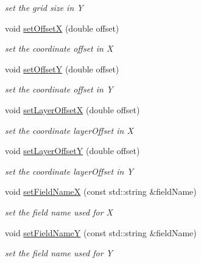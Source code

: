 \begin{DoxyCompactItemize}
\begin{DoxyCompactList}\small\item\em set the grid size in Y \end{DoxyCompactList}\item 
void \hyperlink{class_d_d4hep_1_1_d_d_segmentation_1_1_tiled_layer_grid_x_y_a19c0059402e512da58c2d241d8e67de7}{set\+OffsetX} (double offset)
\begin{DoxyCompactList}\small\item\em set the coordinate offset in X \end{DoxyCompactList}\item 
void \hyperlink{class_d_d4hep_1_1_d_d_segmentation_1_1_tiled_layer_grid_x_y_a588e04b48f59f73af89b54302e3eb025}{set\+OffsetY} (double offset)
\begin{DoxyCompactList}\small\item\em set the coordinate offset in Y \end{DoxyCompactList}\item 
void \hyperlink{class_d_d4hep_1_1_d_d_segmentation_1_1_tiled_layer_grid_x_y_a4368c4380115aa312e1b127e4b15aed9}{set\+Layer\+OffsetX} (double offset)
\begin{DoxyCompactList}\small\item\em set the coordinate layer\+Offset in X \end{DoxyCompactList}\item 
void \hyperlink{class_d_d4hep_1_1_d_d_segmentation_1_1_tiled_layer_grid_x_y_a280670f55a514e9f6f373bef61832ad0}{set\+Layer\+OffsetY} (double offset)
\begin{DoxyCompactList}\small\item\em set the coordinate layer\+Offset in Y \end{DoxyCompactList}\item 
void \hyperlink{class_d_d4hep_1_1_d_d_segmentation_1_1_tiled_layer_grid_x_y_a1e0e7dc80968a2a7513cdd974275e5d5}{set\+Field\+NameX} (const std\+::string \&field\+Name)
\begin{DoxyCompactList}\small\item\em set the field name used for X \end{DoxyCompactList}\item 
void \hyperlink{class_d_d4hep_1_1_d_d_segmentation_1_1_tiled_layer_grid_x_y_a8e33e4196b585e5376e871818e784bfa}{set\+Field\+NameY} (const std\+::string \&field\+Name)
\begin{DoxyCompactList}\small\item\em set the field name used for Y \end{DoxyCompactList}\item 

\end{DoxyCompactItemize}
